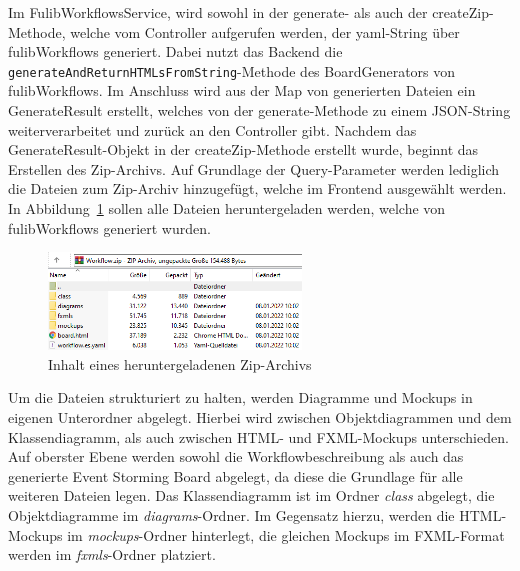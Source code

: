Im FulibWorkflowsService, wird sowohl in der generate- als auch der createZip-Methode, welche vom Controller aufgerufen werden,
der yaml-String über fulibWorkflows generiert.
Dabei nutzt das Backend die \texttt{generateAndReturnHTMLsFromString}-Methode des BoardGenerators von fulibWorkflows.
Im Anschluss wird aus der Map von generierten Dateien ein GenerateResult erstellt, welches von der generate-Methode zu einem JSON-String weiterverarbeitet und zurück an den Controller gibt.
Nachdem das GenerateResult-Objekt in der createZip-Methode erstellt wurde, beginnt das Erstellen des Zip-Archivs.
Auf Grundlage der Query-Parameter werden lediglich die Dateien zum Zip-Archiv hinzugefügt, welche im Frontend ausgewählt werden.
In Abbildung~\ref{fig:export} sollen alle Dateien heruntergeladen werden, welche von fulibWorkflows generiert wurden.

\begin{figure}[h]
    \centering
    \includegraphics[width=0.6\textwidth]{images/3.3/export}
    \caption{Inhalt eines heruntergeladenen Zip-Archivs}
    \label{fig:export}
\end{figure}

Um die Dateien strukturiert zu halten, werden Diagramme und Mockups in eigenen Unterordner abgelegt.
Hierbei wird zwischen Objektdiagrammen und dem Klassendiagramm, als auch zwischen HTML- und FXML-Mockups unterschieden.
Auf oberster Ebene werden sowohl die Workflowbeschreibung als auch das generierte Event Storming Board abgelegt, da diese
die Grundlage für alle weiteren Dateien legen.
Das Klassendiagramm ist im Ordner \textit{class} abgelegt, die Objektdiagramme im \textit{diagrams}-Ordner.
Im Gegensatz hierzu, werden die HTML-Mockups im \textit{mockups}-Ordner hinterlegt, die gleichen Mockups im FXML-Format werden
im \textit{fxmls}-Ordner platziert.
